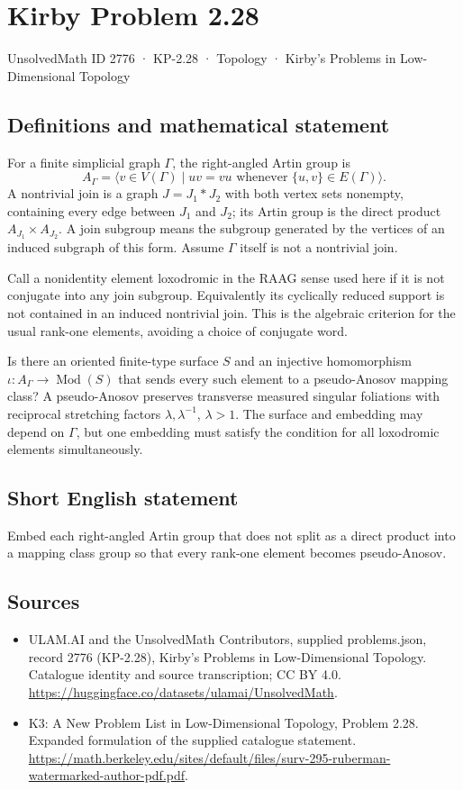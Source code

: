 \documentclass[11pt,a4paper]{article}
\begin{document}
\section*{Kirby Problem 2.28}\label{2776}
{\small UnsolvedMath ID 2776 · KP-2.28 · Topology · Kirby's Problems in Low-Dimensional Topology}
\subsection{Definitions and mathematical statement}
For a finite simplicial graph $\Gamma$, the right-angled Artin group is
\[
 A_\Gamma=\langle v\in V(\Gamma)\mid uv=vu\text{ whenever }\{u,v\}\in E(\Gamma)\rangle.
\]
A nontrivial join is a graph $J=J_1*J_2$ with both vertex sets nonempty,
containing every edge between $J_1$ and $J_2$; its Artin group is the direct
product $A_{J_1}\times A_{J_2}$. A join subgroup means the subgroup generated
by the vertices of an induced subgraph of this form. Assume $\Gamma$ itself
is not a nontrivial join.

Call a nonidentity element loxodromic in the RAAG sense used here if it is
not conjugate into any join subgroup. Equivalently its cyclically reduced
support is not contained in an induced nontrivial join. This is the algebraic
criterion for the usual rank-one elements, avoiding a choice of conjugate word.

Is there an oriented finite-type surface $S$ and an injective homomorphism
$\iota:A_\Gamma\to\operatorname{Mod}(S)$ that sends every such element to a
pseudo-Anosov mapping class? A pseudo-Anosov preserves transverse measured
singular foliations with reciprocal stretching factors $\lambda,\lambda^{-1}$,
$\lambda>1$. The surface and embedding may depend on $\Gamma$, but one
embedding must satisfy the condition for all loxodromic elements simultaneously.
\subsection{Short English statement}
Embed each right-angled Artin group that does not split as a direct product into a mapping class group so that every rank-one element becomes pseudo-Anosov.
\subsection{Sources}
\begin{itemize}
\item[S1] ULAM.AI and the UnsolvedMath Contributors, supplied problems.json, record 2776 (KP-2.28), Kirby's Problems in Low-Dimensional Topology. Catalogue identity and source transcription; CC BY 4.0.
\url{https://huggingface.co/datasets/ulamai/UnsolvedMath}.
\item[S2] K3: A New Problem List in Low-Dimensional Topology, Problem 2.28. Expanded formulation of the supplied catalogue statement.
\url{https://math.berkeley.edu/sites/default/files/surv-295-ruberman-watermarked-author-pdf.pdf}.
\end{itemize}
\end{document}
